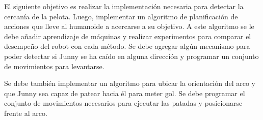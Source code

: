 El siguiente objetivo es realizar la implementación necesaria para detectar la cercanía de la pelota. Luego, implementar un algoritmo de planificación de acciones que lleve al humanoide a acercarse a su objetivo. A este algoritmo se le debe añadir aprendizaje de máquinas y realizar experimentos para comparar el desempeño del robot con cada método. Se debe agregar algún mecanismo para poder detectar si Junny se ha caído en alguna dirección y programar un conjunto de movimientos para levantarse.   

Se debe también implementar un algoritmo para ubicar la orientación del arco y que Junny sea capaz de patear hacia él para meter gol. Se debe programar el conjunto de movimientos necesarios para ejecutar las patadas y posicionarse frente al arco. 





    
